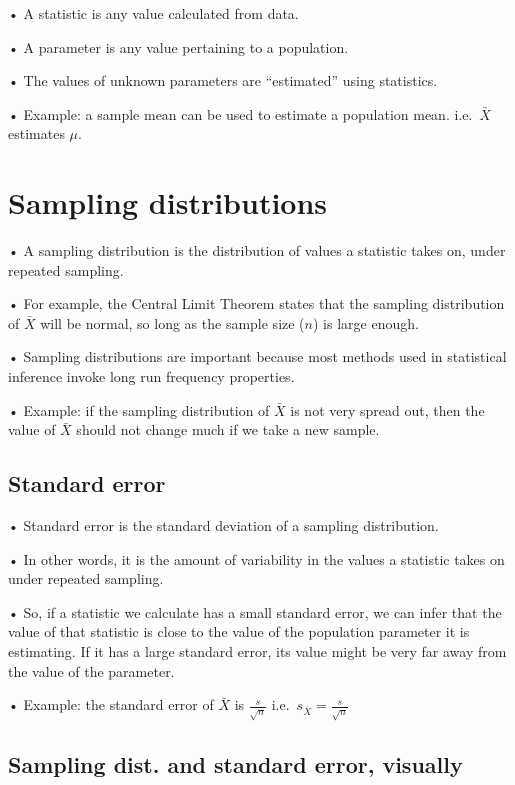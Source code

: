 \documentclass[
  letterpaper,
  DIV=11,
  numbers=noendperiod]{scrreprt}
\begin{document}
• A statistic is any value calculated from data.

• A parameter is any value pertaining to a population.

• The values of unknown parameters are ``estimated'' using statistics.

• Example: a sample mean can be used to estimate a population mean.
i.e.~\(\bar{X}\) estimates \(\mu\).

\hypertarget{sampling-distributions}{%
\section{Sampling distributions}\label{sampling-distributions}}

• A sampling distribution is the distribution of values a statistic
takes on, under repeated sampling.

• For example, the Central Limit Theorem states that the sampling
distribution of \(\bar{X}\) will be normal, so long as the sample size
(\(n\)) is large enough.

• Sampling distributions are important because most methods used in
statistical inference invoke long run frequency properties.

• Example: if the sampling distribution of \(\bar{X}\) is not very
spread out, then the value of \(\bar{X}\) should not change much if we
take a new sample.

\hypertarget{standard-error}{%
\subsection{Standard error}\label{standard-error}}

• Standard error is the standard deviation of a sampling distribution.

• In other words, it is the amount of variability in the values a
statistic takes on under repeated sampling.

• So, if a statistic we calculate has a small standard error, we can
infer that the value of that statistic is close to the value of the
population parameter it is estimating. If it has a large standard error,
its value might be very far away from the value of the parameter.

• Example: the standard error of \(\bar{X}\) is \(\frac{s}{\sqrt{n}}\)
i.e.~\(s_{\bar{X}} = \frac{s}{\sqrt{n}}\)

\hypertarget{sampling-dist.-and-standard-error-visually}{%
\subsection{Sampling dist. and standard error,
visually}\label{sampling-dist.-and-standard-error-visually}}
\end{document}
